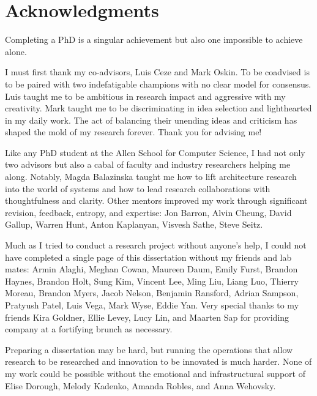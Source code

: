 
\bigskip

\begingroup
\let\clearpage\relax
\let\cleardoublepage\relax
\let\cleardoublepage\relax
\chapter*{Acknowledgments}

\setlength{\parskip}{5pt}%
\setlength{\parindent}{0pt}%

Completing a PhD is a singular achievement but also one impossible to achieve alone.

I must first thank my co-advisors, Luis Ceze and Mark Oskin.
To be coadvised is to be paired with two indefatigable champions with no clear model for consensus.
Luis taught me to be ambitious in research impact and aggressive with my creativity.
Mark taught me to be discriminating in idea selection and lighthearted in my daily work.
The act of balancing their unending ideas and criticism has shaped the mold of my research forever.
Thank you for advising me!

Like any PhD student at the Allen School for Computer Science, I had not only two advisors but also a cabal of faculty and industry researchers helping me along.
Notably, Magda Balazinska taught me how to lift architecture research into the world of systems and how to lead research collaborations with thoughtfulness and clarity.
Other mentors improved my work through significant revision, feedback, entropy, and expertise: Jon Barron, Alvin Cheung, David Gallup, Warren Hunt, Anton Kaplanyan, Visvesh Sathe, Steve Seitz.

Much as I tried to conduct a research project without anyone's help, I could not have completed a single page of this dissertation without my friends and lab mates: Armin Alaghi, Meghan Cowan, Maureen Daum, Emily Furst, Brandon Haynes, Brandon Holt, Sung Kim, Vincent Lee, Ming Liu, Liang Luo, Thierry Moreau, Brandon Myers, Jacob Nelson, Benjamin Ransford, Adrian Sampson, Pratyush Patel, Luis Vega, Mark Wyse, Eddie Yan. Very special thanks to my friends Kira Goldner, Ellie Levey, Lucy Lin, and Maarten Sap for providing company at a fortifying brunch as necessary.

Preparing a dissertation may be hard, but running the operations that allow research to be researched and innovation to be innovated is much harder. None of my work could be possible without the emotional and infrastructural support of Elise Dorough, Melody Kadenko, Amanda Robles, and Anna Wehovsky.

